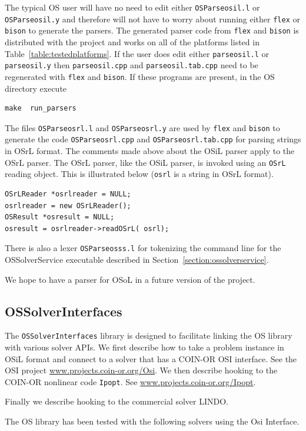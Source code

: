 \documentclass[11pt]{article}
\renewcommand{\_}{{\char"5F}}
\renewcommand{\{}{{\char"7B}}
\renewcommand{\}}{{\char"7D}}
\renewcommand{\^}{{\char"0D}}
\renewcommand{\'}{{\char"0D}}
\newif\ifknitro \knitrofalse    %
\begin{document}
\begin{enumerate}[Step 1:]
The typical OS user will have no need to edit either {\tt OSParseosil.l} or {\tt OSParseosil.y} and therefore will not have to worry about running either {\tt flex} or {\tt bison} to generate the parsers. The generated parser code from {\tt flex} and {\tt bison} is distributed with the project and works on all of the platforms listed in Table~\ref{table:testedplatforms}.  If the user does edit either {\tt parseosil.l} or {\tt parseosil.y} then {\tt parseosil.cpp} and {\tt parseosil.tab.cpp} need to be regenerated with {\tt flex} and {\tt bison}. If these programs are present, in the OS directory  execute
\begin{verbatim}
make  run_parsers
\end{verbatim}

The files {\tt OSParseosrl.l} and {\tt OSParseosrl.y} are used by {\tt flex} and {\tt bison} to  generate the code {\tt OSParseosrl.cpp} and {\tt OSParseosrl.tab.cpp} for parsing strings in OSrL format. The comments made above about the OSiL parser apply to the OSrL parser. The OSrL parser, like the OSiL parser, is invoked using an {\tt OSrL} reading object. This is illustrated below ({\tt osrl} is a string in OSrL format).
\begin{verbatim}
OSrLReader *osrlreader = NULL;
osrlreader = new OSrLReader();
OSResult *osresult = NULL;
osresult = osrlreader->readOSrL( osrl);
\end{verbatim}

There is also a lexer {\tt OSParseosss.l} for tokenizing the command line for the OSSolverService executable described in Section~\ref{section:ossolverservice}.

We hope to have a parser for OSoL  in a future version of the project.


\subsection{OSSolverInterfaces}\label{section:ossolverinterfaces}


The {\tt OSSolverInterfaces} library is designed to facilitate linking the OS library with various solver APIs. 
We first describe how to take a problem instance in OSiL format and connect to a solver that has a COIN-OR OSI interface.  
See the OSI project \url{www.projects.coin-or.org/Osi}.   
We then describe hooking to the COIN-OR nonlinear code {\tt Ipopt}. See \url{www.projects.coin-or.org/Ipopt}.  
\ifknitro
Finally we describe hooking to two commercial solvers KNITRO\index{KNITRO} and LINDO\index{LINDO}.
\else
Finally we describe hooking to the commercial solver LINDO.
\fi
The OS library has been tested with the following solvers using the Osi Interface.


\end{enumerate}
\end{document}
